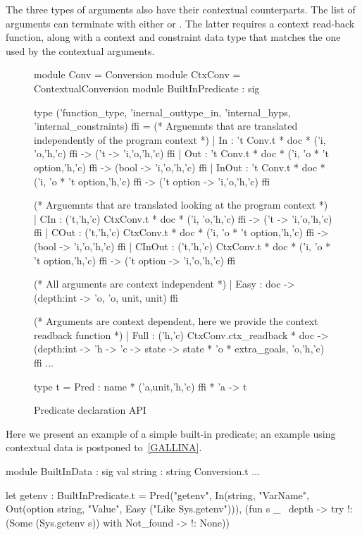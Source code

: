 \documentclass[a4paper, 11pt]{book}
\begin{document}
The three types of arguments also have their contextual counterparts. The list
of arguments can terminate with either  or . The
latter requires a context read-back function, along with a context and
constraint data type that matches the one used by the contextual arguments.

\begin{figure}
\begin{ocamlcode}
module Conv = Conversion
module CtxConv = ContextualConversion
module BuiltInPredicate : sig

type ('function_type, 'inernal_outtype_in, 'internal_hyps, 'internal_constraints) ffi =
  (* Arguemnts that are translated independently of the program context *)
  | In    : 't Conv.t * doc * ('i, 'o,'h,'c) ffi -> ('t -> 'i,'o,'h,'c) ffi
  | Out   : 't Conv.t * doc * ('i, 'o * 't option,'h,'c) ffi -> (bool -> 'i,'o,'h,'c) ffi
  | InOut : 't Conv.t * doc * ('i, 'o * 't option,'h,'c) ffi -> ('t option -> 'i,'o,'h,'c) ffi

  (* Arguemnts that are translated looking at the program context *)
  | CIn    : ('t,'h,'c) CtxConv.t * doc * ('i, 'o,'h,'c) ffi -> ('t -> 'i,'o,'h,'c) ffi
  | COut   : ('t,'h,'c) CtxConv.t * doc * ('i, 'o * 't option,'h,'c) ffi -> (bool -> 'i,'o,'h,'c) ffi
  | CInOut : ('t,'h,'c) CtxConv.t * doc * ('i, 'o * 't option,'h,'c) ffi -> ('t option -> 'i,'o,'h,'c) ffi

  (* All arguments are context independent *)
  | Easy : doc -> (depth:int -> 'o, 'o, unit, unit) ffi

  (* Arguments are context dependent, here we provide the context readback function *)
  | Full : ('h,'c) CtxConv.ctx_readback * doc ->
     (depth:int -> 'h -> 'c -> state ->
        state * 'o * extra_goals, 'o,'h,'c) ffi
  ...

type t = Pred : name * ('a,unit,'h,'c) ffi * 'a -> t
\end{ocamlcode}
\caption{Predicate declaration API\label{fig:ffi}}
\end{figure}


Here we present an example of a simple built-in predicate; an example using
contextual data is postponed to~\cref{GALLINA}.

\begin{ocamlcode}
  module BuiltInData : sig
    val string : string Conversion.t
  ...

  let getenv : BuiltInPredicate.t =
    Pred("getenv",
      In(string,  "VarName",
      Out(option string, "Value",
      Easy ("Like Sys.getenv"))),
       (fun s _ ~depth ->
          try !:(Some (Sys.getenv s))   %
          with Not_found -> !: None))   %
\end{ocamlcode}
\end{document}
